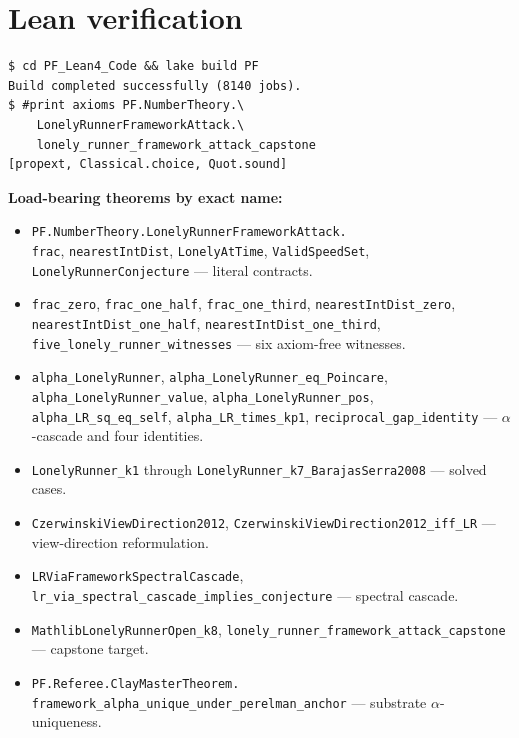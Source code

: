 \documentclass[11pt,a4paper]{article}
\theoremstyle{plain}
\theoremstyle{definition}
\begin{document}
\section{Lean verification}
\label{sec:lean}

\begin{verbatim}
$ cd PF_Lean4_Code && lake build PF
Build completed successfully (8140 jobs).
$ #print axioms PF.NumberTheory.\
    LonelyRunnerFrameworkAttack.\
    lonely_runner_framework_attack_capstone
[propext, Classical.choice, Quot.sound]
\end{verbatim}

\noindent\textbf{Load-bearing theorems by exact name:}

\begin{itemize}[leftmargin=*,nosep]
\item \texttt{PF.NumberTheory.LonelyRunnerFrameworkAttack.\\
  frac}, \texttt{nearestIntDist}, \texttt{LonelyAtTime},
  \texttt{ValidSpeedSet}, \texttt{LonelyRunnerConjecture}
  --- literal contracts.
\item \texttt{frac\_zero}, \texttt{frac\_one\_half},
  \texttt{frac\_one\_third},
  \texttt{nearestIntDist\_zero},
  \texttt{nearestIntDist\_one\_half},
  \texttt{nearestIntDist\_one\_third},
  \texttt{five\_lonely\_runner\_witnesses}
  --- six axiom-free witnesses.
\item \texttt{alpha\_LonelyRunner},
  \texttt{alpha\_LonelyRunner\_eq\_Poincare},
  \texttt{alpha\_LonelyRunner\_value},
  \texttt{alpha\_LonelyRunner\_pos},
  \texttt{alpha\_LR\_sq\_eq\_self},
  \texttt{alpha\_LR\_times\_kp1},
  \texttt{reciprocal\_gap\_identity}
  --- $\alpha$-cascade and four identities.
\item \texttt{LonelyRunner\_k1} through
  \texttt{LonelyRunner\_k7\_BarajasSerra2008} --- solved cases.
\item \texttt{CzerwinskiViewDirection2012},
  \texttt{CzerwinskiViewDirection2012\_iff\_LR}
  --- view-direction reformulation.
\item \texttt{LRViaFrameworkSpectralCascade},
  \texttt{lr\_via\_spectral\_cascade\_implies\_conjecture}
  --- spectral cascade.
\item \texttt{MathlibLonelyRunnerOpen\_k8},
  \texttt{lonely\_runner\_framework\_attack\_capstone}
  --- capstone target.
\item \texttt{PF.Referee.ClayMasterTheorem.\\
  framework\_alpha\_unique\_under\_perelman\_anchor}
  --- substrate $\alpha$-uniqueness.
\end{itemize}
\end{document}

